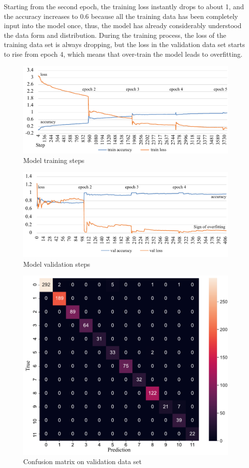 Starting from the second epoch, the training loss instantly drops to about 1, and the accuracy increases to 0.6 because all the training data has been completely input into the model once, thus, the model has already considerably understood the data form and distribution.
During the training process, the loss of the training data set is always dropping, but the loss in the validation data set starts to rise from epoch 4, which means that over-train the model leads to overfitting.
\vspace*{-.5em}
\begin{figure}[!ht]
    \centering
    \includegraphics[width=.84\textwidth]{evaluation/imgs/5-train-step.pdf}
    \caption{Model training steps}
    \label{fig:5-train-step}
\end{figure}
\vspace*{-.5em}
\begin{figure}[!ht]
    \centering
    \includegraphics[width=.84\textwidth]{evaluation/imgs/5-val-steps.pdf}
    \caption{Model validation steps}
    \label{fig:5-val-steps}
\end{figure}

\clearpage
\begin{figure}[H]
    \centering
    \includegraphics[width=.75\textwidth]{evaluation/imgs/5-confusion_matrix_val.pdf}
    \caption{Confusion matrix on validation data set}
    \label{fig:5-confusion_matrix_val}
\end{figure}

